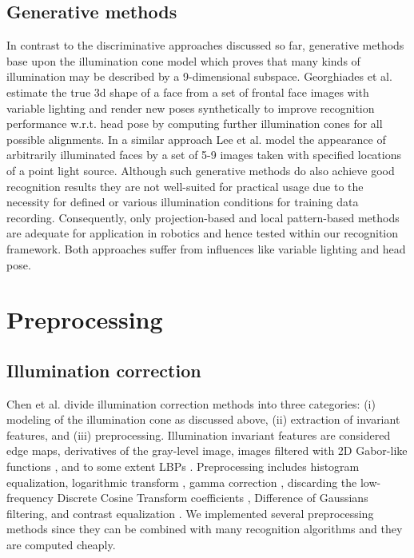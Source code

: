 \subsection{Generative methods}
\label{chap:relwork:sec:recognition:subsec:generative}
In contrast to the discriminative approaches discussed so far, generative methods base upon the illumination cone model \cite{Basri2003} which proves that many kinds of illumination may be described by a 9-dimensional subspace.
Georghiades et al. \cite{Georghiades01} estimate the true 3d shape of a face from a set of frontal face images with variable lighting and render new poses synthetically to improve recognition performance w.r.t. head pose by computing further illumination cones for all possible alignments.
In a similar approach Lee et al. \cite{Lee05} model the appearance of arbitrarily illuminated faces by a set of 5-9 images taken with specified locations of a point light source. 
Although such generative methods do also achieve good recognition results they are not well-suited for practical usage due to the necessity for defined or various illumination conditions for training data recording.
Consequently, only projection-based and local pattern-based methods are adequate for application in robotics and hence tested within our recognition framework.
Both approaches suffer from influences like variable lighting and head pose. 

\section{Preprocessing}
\subsection{Illumination correction}
Chen et al. \cite{chen06} divide illumination correction methods into three categories: (i) modeling of the illumination cone as discussed above, (ii) extraction of invariant features, and (iii) preprocessing.
Illumination invariant features are considered edge maps, derivatives of the gray-level image, images filtered with 2D Gabor-like functions \cite{Adini1997}, and to some extent LBPs \cite{Ahonen2006}.
Preprocessing includes histogram equalization, logarithmic transform \cite{liu02}, gamma correction \cite{Goel11}, discarding the low-frequency Discrete Cosine Transform coefficients \cite{chen06}, Difference of Gaussians filtering, and contrast equalization \cite{Tan2010}.
We implemented several preprocessing methods since they can be combined with many recognition algorithms and they are computed cheaply.

